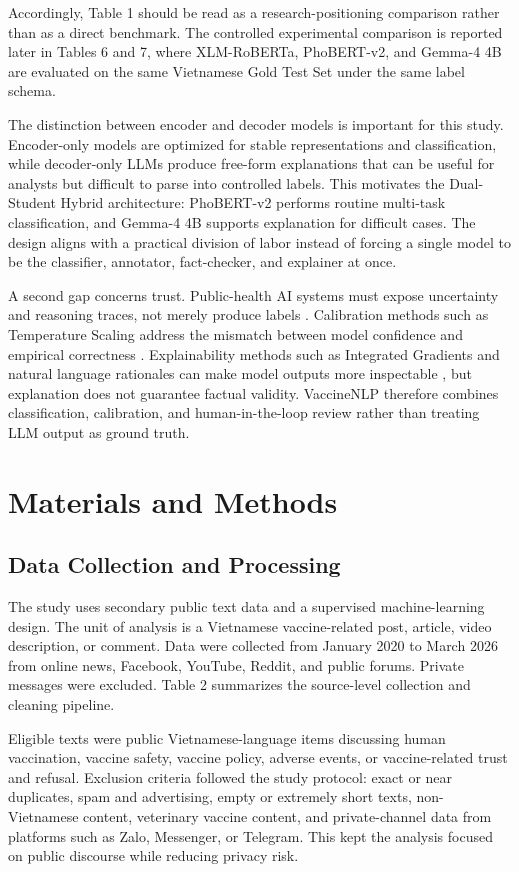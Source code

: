 \documentclass[runningheads]{llncs}
\begin{document}
Accordingly, Table 1 should be read as a research-positioning comparison rather than as a direct benchmark. The controlled experimental comparison is reported later in Tables 6 and 7, where XLM-RoBERTa, PhoBERT-v2, and Gemma-4 4B are evaluated on the same Vietnamese Gold Test Set under the same label schema.

The distinction between encoder and decoder models is important for this study. Encoder-only models are optimized for stable representations and classification, while decoder-only LLMs produce free-form explanations that can be useful for analysts but difficult to parse into controlled labels. This motivates the Dual-Student Hybrid architecture: PhoBERT-v2 performs routine multi-task classification, and Gemma-4 4B supports explanation for difficult cases. The design aligns with a practical division of labor instead of forcing a single model to be the classifier, annotator, fact-checker, and explainer at once.

A second gap concerns trust. Public-health AI systems must expose uncertainty and reasoning traces, not merely produce labels \cite{holzinger2019causability}. Calibration methods such as Temperature Scaling address the mismatch between model confidence and empirical correctness \cite{guo2017calibration,desai2020calibration}. Explainability methods such as Integrated Gradients and natural language rationales can make model outputs more inspectable \cite{sundararajan2017integrated}, but explanation does not guarantee factual validity. VaccineNLP therefore combines classification, calibration, and human-in-the-loop review rather than treating LLM output as ground truth.

\section{Materials and Methods}
\subsection{Data Collection and Processing}
The study uses secondary public text data and a supervised machine-learning design. The unit of analysis is a Vietnamese vaccine-related post, article, video description, or comment. Data were collected from January 2020 to March 2026 from online news, Facebook, YouTube, Reddit, and public forums. Private messages were excluded. Table 2 summarizes the source-level collection and cleaning pipeline.

Eligible texts were public Vietnamese-language items discussing human vaccination, vaccine safety, vaccine policy, adverse events, or vaccine-related trust and refusal. Exclusion criteria followed the study protocol: exact or near duplicates, spam and advertising, empty or extremely short texts, non-Vietnamese content, veterinary vaccine content, and private-channel data from platforms such as Zalo, Messenger, or Telegram. This kept the analysis focused on public discourse while reducing privacy risk.
\end{document}
